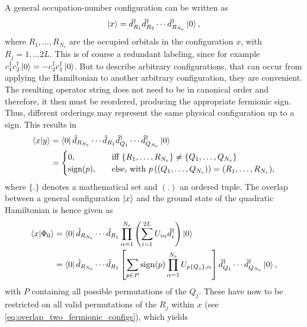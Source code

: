 \documentclass[../../../main.tex]{subfiles}
\begin{document}
A general occupation-number configuration can be written as
\begin{equation}
    \left\lvert x \right\rangle
    =
    \hat d_{R_1}^\dagger
    \hat d_{R_2}^\dagger
    \cdots
    \hat d_{R_{N_{e}}}^\dagger
    \left\lvert 0 \right\rangle,
    \label{eq:configuration-state}
\end{equation}
where $R_1,\ldots,R_{N_{e}}$ are the occupied orbitals in the
configuration $x$, with $R_j = 1, \ldots 2L$. This is of course a redundant labeling, since for example $c_1^\dagger c_2^\dagger \left\lvert 0 \right\rangle= - c_2^\dagger c_1^\dagger \left\lvert 0 \right\rangle$. But to describe arbitrary configurations, that can occur from applying the Hamiltonian to another arbitrary configuration, they are convenient. The resulting operator string does not need to be in canonical order and therefore, it then must be reordered, producing the appropriate fermionic sign. Thus, different orderings may represent the same physical configuration up to a sign. This results in
\begin{align}
    \left\langle x \middle| y \right\rangle &= \left\langle 0 \right\rvert \hat d_{R_{N_e}} \cdots \hat d_{R_1} \hat d^\dagger_{Q_1} \cdots \hat d^\dagger_{Q_{N_e}} \left\lvert 0 \right\rangle \notag \\
    &= \begin{cases}
        0 , \quad &\text{iff } \{R_1, \ldots, R_{N_e}\} \neq \{Q_1, \ldots, Q_{N_e}\} \\
        \operatorname{sign} (p), \quad &\text{else, with } p\left( (Q_1, \ldots, Q_{N_e}) \right) = (R_1, \ldots, R_{N_e}) ,
    \end{cases} \label{eq:overlap_two_fermionic_configs}
\end{align}
where $\{ . \}$ denotes a mathematical set and $( . )$ an ordered tuple. The overlap between a general configuration $\left\lvert x \right\rangle$ and the ground state of the quadratic Hamiltonian is hence given as
\begin{align}
    \left\langle x \middle| \Phi_0 \right\rangle
    &=
    \left\langle 0 \right\rvert
    \hat d_{R_{N_{e}}}
    \cdots
    \hat d_{R_1}
    \prod_{\alpha=1}^{N_{e}}
    \left(
        \sum_{i=1}^{2L}
        U_{i\alpha}\hat d_i^\dagger
    \right)
    \left\lvert 0 \right\rangle
    \nonumber\\
    &=
    \left\langle 0 \right\rvert
    \hat d_{R_{N_{e}}}
    \cdots
    \hat d_{R_1}
    \left[\sum_{p\in P}
    \operatorname{sign}(p)
    \prod_{\alpha=1}^{N_{e}}
    U_{p\{Q_j\},\alpha}\right] \hat d^\dagger_{Q_1}
    \cdots
    \hat d^\dagger_{Q_{N_{e}}} \left\lvert 0 \right\rangle,
    \label{eq:overlap-permutation-sum}
\end{align}
with $P$ containing all possible permutations of the $Q_j$. These have now to be restricted on all valid permutations of the $R_j$ within $x$ (see \cref{eq:overlap_two_fermionic_configs}), which yields
\end{document}
